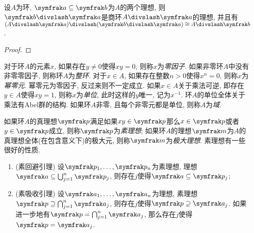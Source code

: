 \begin{proposition}\label{prop:thirdisomorphism}
  设$A$为环, $\ideal{a}\subseteq\ideal{b}$为$A$的两个理想, 则$\ideal{b}{\divslash}\ideal{a}$是商环$A{\divslash}\ideal{a}$的理想, 并且有$(A{\divslash}\ideal{a}){\divslash}(\ideal{b}{\divslash}\ideal{a})\cong A{\divslash}\ideal{b}$.
\end{proposition}

\begin{proof}

\end{proof}

对于环$A$的元素$x$, 如果存在$y\neq 0$使得$xy=0$, 则称$x$为\emph{零因子}. 如果非零环$A$中没有非零零因子, 则称环$A$为\emph{整环}. 对于$x\in A$, 如果存在整数$n>0$使得$x^n = 0$, 则称$x$为\emph{幂零元}. 幂零元为零因子, 反过来则不一定成立. 如果$x\in A$关于乘法可逆, 即存在$y\in A$使得$xy=1$, 则称$x$为\emph{单位}, 此时这样的$y$唯一, 记为$x^{-1}$. 环$A$的单位全体关于乘法有Abel群的结构. 如果环$A$非零, 且每个非零元都是单位, 则称$A$为\emph{域}.

如果环$A$的真理想$\ideal{p}$满足如果$xy\in\ideal{p}$那么$x\in \ideal{p}$或者$y\in\ideal{p}$成立, 则称$\ideal{p}$为\emph{素理想}; 如果环$A$的理想$\ideal{m}$为$A$的真理想全体(在包含意义下)的极大元, 则称$\ideal{m}$为\emph{极大理想}. 素理想有一些很好的性质.

\begin{proposition}\label{prop:prime}\leavevmode
  \begin{enumerate}
    \item\label{enum:prop-prime-avoid}(素回避引理) 设$\ideal{p}_1, \dotsc, \ideal{p}_n$为素理想, 理想$\ideal{a}\subseteq\bigcup_{j=1}^n\ideal{p}_j$, 则存在$j$使得$\ideal{a}\subseteq \ideal{p}_j$;
    \item\label{enum:prop-prime-absorb}(素吸收引理) 设$\ideal{a}_1, \dotsc, \ideal{a}_n$为理想, 素理想$\ideal{p}\supseteq\bigcap_{j=1}^n\ideal{a}_j$, 则存在$j$使得$\ideal{p}\supseteq\ideal{a}_j$. 如果进一步地有$\ideal{p}=\bigcap_{j=1}^n\ideal{a}_j$, 那么存在$j$使得$\ideal{p}=\ideal{a}_j$.
  \end{enumerate}
\end{proposition}

